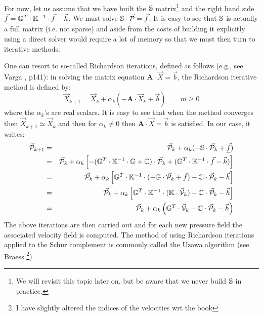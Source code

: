 For now, let us assume that we have built the ${\mathbb{S}}$ matrix\footnote{We will 
revisit this topic later on, but be aware that we never build ${\mathbb{S}}$ in practice.} 
and the right hand 
side $\underline{\vec{f}}={\mathbb{G}}^T \cdot {\mathbb{K}}^{-1} \cdot \vec{f} - \vec{h}$.
We must solve ${\mathbb{S}}\cdot \vec{\cal P} = \underline{\vec{f}}$.
It is easy to see that ${\mathbb{S}}$ is actually a full matrix (i.e. not sparse) and 
aside from the costs of building it explicitly using a direct solver would require 
a lot of memory so that we must then turn to iterative methods. 

One can resort to so-called Richardson iterations, defined as follows 
(e.g., see Varga \cite{varga}, p141):
in solving the matrix equation ${\bm A}\cdot {\vec X}={\vec b}$,
the Richardson iterative method is defined by: 
\begin{equation}
{\vec X}_{k+1} = {\vec X}_k + \alpha_k (-{\bm A} \cdot {\vec X}_k + {\vec b})
\quad\quad
m\geq 0 
\end{equation}
where the $\alpha_k$'s are real scalars. 
It is easy to see that when the method converges then ${\vec X}_{k+1} \simeq {\vec X}_k$  and then 
for $\alpha_k\neq 0$ then ${\bm A}\cdot {\vec X}={\vec b}$ is satisfied. 
In our case, it writes:
\begin{eqnarray}
\vec {\cal P}_{k+1} 
&=& \vec {\cal P}_{k} + \alpha_k ( - {\mathbb{S}} \cdot \vec{\cal P}_{k}  +  \underline{\vec{f}}) \nonumber\\
&=& \vec {\cal P}_{k} + \alpha_k \left[ - ({\mathbb{G}}^T \cdot {\mathbb{K}}^{-1} \cdot {\mathbb{G}} + {\mathbb{C}})  \cdot \vec{\cal P}_{k} 
+  ({\mathbb{G}}^T \cdot {\mathbb{K}}^{-1} \cdot \vec{f} - \vec{h}   ) \right] \nonumber\\
&=& \vec {\cal P}_{k} + \alpha_k \left[ {\mathbb{G}}^T \cdot {\mathbb{K}}^{-1} \cdot ( - {\mathbb{G}} \cdot \vec{\cal P}_{k} + \vec{f}) 
-{\mathbb{C}} \cdot \vec{\cal P}_{k} - \vec{h} 
\right] \nonumber\\
&=& \vec {\cal P}_{k} + \alpha_k \left[ {\mathbb{G}}^T \cdot {\mathbb{K}}^{-1} \cdot ( {\mathbb{K}}\cdot \vec{\cal V}_k)
-{\mathbb{C}} \cdot \vec{\cal P}_{k}  - \vec{h} \right] \nonumber\\
&=& \vec {\cal P}_{k} + \alpha_k \left( {\mathbb{G}}^T \cdot \vec{\cal V}_k -{\mathbb{C}} \cdot \vec{\cal P}_{k} - \vec{h} \right) 
\end{eqnarray}
The above iterations are then carried out and for each new pressure field the associated velocity field 
is computed. The method of using Richardson iterations applied to the Schur complement 
is commonly called the Uzawa algorithm (see Braess \cite[p221]{braess}
\footnote{I have slightly 
altered the indices of the velocities wrt the book}).

